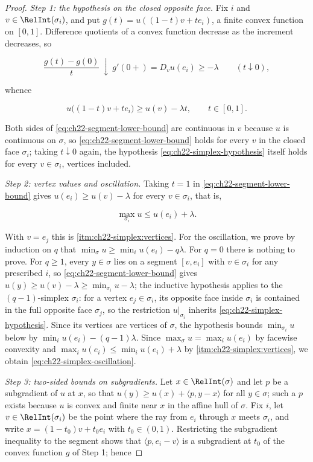\begin{proof}
\emph{Step 1: the hypothesis on the closed opposite face.}
Fix $i$ and $v\in\RelInt(\sigma_i)$, and put
$g(t)=u((1-t)v+te_i)$, a finite convex function on $[0,1]$.  Difference
quotients of a convex function decrease as the increment decreases, so

\[
 \frac{g(t)-g(0)}{t}\ \downarrow\ g'(0+)=D_vu(e_i)\geq-\lambda
 \qquad(t\downarrow0),
\]

whence

\[
 u\bigl((1-t)v+te_i\bigr)\geq u(v)-\lambda t,
 \qquad t\in[0,1].
\tag{22.13}\label{eq:ch22-segment-lower-bound}
\]

Both sides of \eqref{eq:ch22-segment-lower-bound} are continuous in $v$
because $u$ is continuous on $\sigma$, so
\eqref{eq:ch22-segment-lower-bound} holds for every $v$ in the closed face
$\sigma_i$; taking $t\downarrow0$ again, the hypothesis
\eqref{eq:ch22-simplex-hypothesis} itself holds for every
$v\in\sigma_i$, vertices included.

\emph{Step 2: vertex values and oscillation.}  Taking $t=1$ in
\eqref{eq:ch22-segment-lower-bound} gives
$u(e_i)\geq u(v)-\lambda$ for every $v\in\sigma_i$, that is,

\[
 \max_{\sigma_i}u\leq u(e_i)+\lambda .
\tag{22.14}\label{eq:ch22-facet-max-bound}
\]

With $v=e_j$ this is
\cref{itm:ch22-simplex:vertices}.  For the oscillation, we prove by
induction on $q$ that
$\min_\sigma u\geq\min_iu(e_i)-q\lambda$.  For $q=0$ there is nothing to
prove.  For $q\geq1$, every $y\in\sigma$ lies on a segment
$[v,e_i]$ with $v\in\sigma_i$ for any prescribed $i$, so
\eqref{eq:ch22-segment-lower-bound} gives
$u(y)\geq u(v)-\lambda\geq\min_{\sigma_i}u-\lambda$; the inductive
hypothesis applies to the $(q-1)$-simplex $\sigma_i$: for a vertex
$e_j\in\sigma_i$, its opposite face inside $\sigma_i$ is contained in
the full opposite face $\sigma_j$, so the restriction $u|_{\sigma_i}$
inherits \eqref{eq:ch22-simplex-hypothesis}.  Since its vertices are
vertices of $\sigma$, the hypothesis bounds $\min_{\sigma_i}u$ below by
$\min_iu(e_i)-(q-1)\lambda$.  Since
$\max_\sigma u=\max_iu(e_i)$ by facewise convexity and
$\max_iu(e_i)\leq\min_iu(e_i)+\lambda$ by
\cref{itm:ch22-simplex:vertices}, we obtain
\eqref{eq:ch22-simplex-oscillation}.

\emph{Step 3: two-sided bounds on subgradients.}  Let
$x\in\RelInt(\sigma)$ and let $p$ be a subgradient of $u$ at $x$,
so that $u(y)\geq u(x)+\langle p,y-x\rangle$ for all $y\in\sigma$; such
a $p$ exists because $u$ is convex and finite near $x$ in the affine
hull of $\sigma$.  Fix $i$, let $v\in\RelInt(\sigma_i)$ be the point
where the ray from $e_i$ through $x$ meets $\sigma_i$, and write
$x=(1-t_0)v+t_0e_i$ with $t_0\in(0,1)$.  Restricting the subgradient
inequality to the segment shows that $\langle p,e_i-v\rangle$ is a
subgradient at $t_0$ of the convex function $g$ of Step 1; hence


\end{proof}
